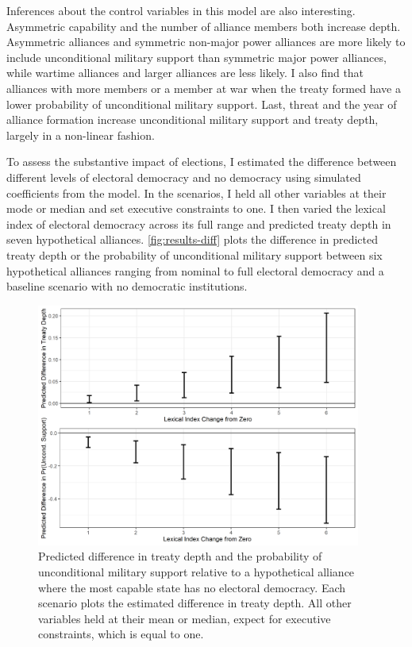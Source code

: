 \documentclass[12pt]{article}
\begin{document}
Inferences about the control variables in this model are also interesting.
Asymmetric capability and the number of alliance members both increase depth. 
Asymmetric alliances and symmetric non-major power alliances are more likely to include unconditional military support than symmetric major power alliances, while wartime alliances and larger alliances are less likely. 
I also find that alliances with more members or a member at war when the treaty formed have a lower probability of unconditional military support. 
Last, threat and the year of alliance formation increase unconditional military support and treaty depth, largely in a non-linear fashion.


To assess the substantive impact of elections, I estimated the difference between different levels of electoral democracy and no democracy using simulated coefficients from the model. 
In the scenarios, I held all other variables at their mode or median and set executive constraints to one. 
I then varied the lexical index of electoral democracy across its full range and predicted treaty depth in seven hypothetical alliances. 
\autoref{fig:results-diff} plots the difference in predicted treaty depth or the probability of unconditional military support between six hypothetical alliances ranging from nominal to full electoral democracy and a baseline scenario with no democratic institutions. 


\begin{figure}[hbtp]
\centering
\includegraphics[width=0.95\textwidth]{../figures/results-diff.png}
\caption{Predicted difference in treaty depth and the probability of unconditional military support relative to a hypothetical alliance where the most capable state has no electoral democracy. Each scenario plots the estimated difference in treaty depth. All other variables held at their mean or median, expect for executive constraints, which is equal to one.}
\label{fig:results-diff}
\end{figure}
\end{document}
